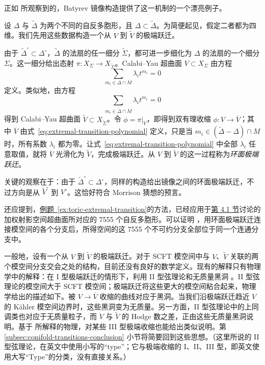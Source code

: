 正如  所观察到的，Batyrev 镜像构造提供了这一机制的一个漂亮例子。

\begin{example}\label{ex:toric-extremal-transition}
设 $\Delta$ 与 $\widetilde\Delta$ 为两个不同的自反多胞形，且 $\Delta\subset\widetilde\Delta$。为简便起见，假定二者都为四维。我们先用这些数据构造一个从 $V$ 到 $\widetilde V$ 的极端跃迁。

由于 $\widetilde\Delta^\circ\subset\Delta^\circ$，$\widetilde\Delta$ 的法扇的任一细分 $\widetilde\Sigma$，都可进一步细化为 $\Delta$ 的法扇的一个细分 $\Sigma$。这一细分给出态射 $\pi:X_\Sigma\to X_{\widetilde\Sigma}$。Calabi--Yau 超曲面 $V\subset X_\Sigma$ 由方程
\[
\sum_{m_i\in\Delta\cap M}\lambda_i t^{m_i}=0
\]
定义。类似地，由方程
\begin{equation}\label{eq:extremal-transition-polynomial}
\sum_{m_i\in\widetilde\Delta\cap M}\lambda_i t^{m_i}=0
\end{equation}
得到 Calabi--Yau 超曲面 $\widetilde V\subset X_{\widetilde\Sigma}$。令 $\phi=\pi|_V$，即得到双有理收缩 $\phi:V\to\overline V$；其中 $\overline V$ 由式~\eqref{eq:extremal-transition-polynomial} 定义，只是当 $m_i\in(\widetilde\Delta-\Delta)\cap M$ 时，所有系数 $\lambda_i$ 都为零。让式~\eqref{eq:extremal-transition-polynomial} 中全部 $\lambda_i$ 任意取值，就将 $\overline V$ 光滑化为 $\widetilde V$，完成极端跃迁。从 $V$ 到 $\widetilde V$ 的这一过程称为\emph{环面极端跃迁}。

关键的观察在于：由于 $\widetilde\Delta^\circ\subset\Delta^\circ$，同样的构造给出镜像之间的环面极端跃迁，不过方向是从 $\widetilde V^\circ$ 到 $V^\circ$。这恰好符合 Morrison 猜想的预言。
\end{example}

还应提到，\hyperref[ex:toric-extremal-transition]{例题~\ref*{ex:toric-extremal-transition}}的方法，已经应用于\hyperref[sec:batyrev-mirror]{第 4.1 节}讨论的加权射影空间超曲面所对应的 7555 个自反多胞形。可以证明 ，用环面极端跃迁连接模空间的各个分支后，所得空间的这 7555 个不可约分支全部位于同一个连通分支中。

一般地，设有一个从 $V$ 到 $\widetilde V$ 的极端跃迁。对于 SCFT 模空间中与 $V$、$\widetilde V$ 关联的两个模空间分支交会之处的结构，目前还没有良好的数学定义。现有的解释只有物理学中的解释：在 I 型极端跃迁的情形下，利用 II 型弦理论和无质量黑洞 。II 型弦理论的模空间大于 SCFT 模空间；极端跃迁将这些更大的模空间粘合起来，物理学给出的描述如下。被 $V\to\overline V$ 收缩的曲线对应于黑洞。当我们沿极端跃迁趋近 $V$ 的 Kähler 模空间边界时，这些黑洞变为无质量。另一方面，II 型弦理论中的上同调类也对应于无质量粒子，而 $V$ 与 $\widetilde V$ 的 Hodge 数之差，正由这些无质量黑洞说明。基于  所解释的物理，对某些 III 型极端收缩也能给出类似说明。第 \hyperref[subsec:conifold-transitions-conclusion]{\ref*{subsec:conifold-transitions-conclusion}} 小节将简要回到这些思想。（这里所说的 II 型弦理论，在英文中使用小写的“type”；它与极端收缩的 I、II、III 型，即英文使用大写“Type”的分类，没有直接关系。）

